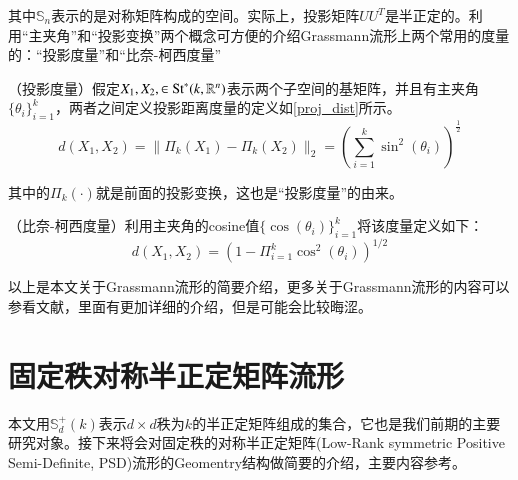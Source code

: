 其中$\mathbb{S}_n$表示的是对称矩阵构成的空间。实际上，投影矩阵$UU^{T}$是半正定的。利用“主夹角”和“投影变换”两个概念可方便的介绍Grassmann流形上两个常用的度量的：“投影度量”和“比奈-柯西度量”
\begin{definition}
\label{Projection_metric}
{\heiti （投影度量）}假定$X_1,X_2,\in {\rm St}^{*}(k,\mathbb{R}^{n})$表示两个子空间的基矩阵，并且有主夹角$\{\theta_i\}_{i=1}^{k}$，两者之间定义投影距离度量的定义如\ref{proj_dist}所示。
\begin{equation}
\label{proj_dist}
d(X_1,X_2)=\|\Pi_k(X_1)-\Pi_k(X_2)\|_{2}=\left(\sum_{i=1}^{k}\sin^{2}(\theta_i)\right)^{\frac{1}{2}}
\end{equation}
\end{definition}
其中的$\Pi_k(\cdot)$就是前面的投影变换，这也是“投影度量”的由来。
\begin{definition}
\label{BC_metric}
{\heiti （比奈-柯西度量）}利用主夹角的cosine值$\{\cos(\theta_i)\}_{i=1}^{k}$将该度量定义如下：
\begin{equation}
d(X_1,X_2)=\left(1-\Pi_{i=1}^{k}\cos^{2}(\theta_i)\right)^{1/2}
\end{equation}
\end{definition}
以上是本文关于Grassmann流形的简要介绍，更多关于Grassmann流形的内容可以参看文献\cite{Grassmann}，里面有更加详细的介绍，但是可能会比较晦涩。
\section{固定秩对称半正定矩阵流形}
\label{sec:Fixed-rank-PSD}
本文用$\mathbb{S}_{d}^{+}(k)$表示$d \times d$秩为$k$的半正定矩阵组成的集合，它也是我们前期的主要研究对象。接下来将会对固定秩的对称半正定矩阵(Low-Rank symmetric Positive Semi-Definite, PSD)流形的Geomentry结构做简要的介绍，主要内容参考\cite{PSD_Riemannian}。

